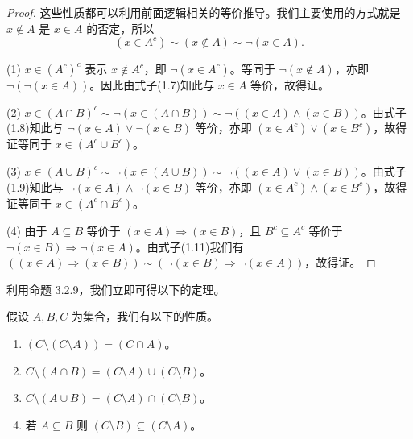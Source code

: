\begin{proof}
这些性质都可以利用前面逻辑相关的等价推导。我们主要使用的方式就是 $x \notin A$ 是 $x \in A$ 的否定，所以
$$ (x \in A^c) \sim (x \notin A)\sim \neg(x \in A). $$

(1) $x \in (A^c)^c$ 表示 $x \notin A^c$，即 $\neg(x \in A^c)$。等同于 $\neg(x \notin A)$，亦即 $\neg(\neg(x \in A))$。因此由式子(1.7)知此与 $x \in A$ 等价，故得证。

(2) $x \in (A \cap B)^c \sim \neg(x \in (A \cap B)) \sim \neg((x \in A) \wedge (x \in B))$。由式子(1.8)知此与 $\neg(x \in A) \vee \neg(x \in B)$ 等价，亦即 $(x \in A^c) \vee (x \in B^c)$，故得证等同于 $x \in (A^c \cup B^c)$。

(3) $x \in (A \cup B)^c \sim \neg(x \in (A \cup B)) \sim \neg((x \in A) \vee (x \in B))$。由式子(1.9)知此与 $\neg(x \in A) \wedge \neg(x \in B)$ 等价，亦即 $(x \in A^c) \wedge (x \in B^c)$，故得证等同于 $x \in (A^c \cap B^c)$。

(4) 由于 $A \subseteq B$ 等价于 $(x \in A) \Rightarrow (x \in B)$，且 $B^c \subseteq A^c$ 等价于 $\neg(x \in B) \Rightarrow \neg(x \in A)$。由式子(1.11)我们有$((x \in A) \Rightarrow (x \in B)) \sim (\neg(x \in B) \Rightarrow \neg(x \in A))$，故得证。
\end{proof}

利用命题 3.2.9，我们立即可得以下的定理。

\begin{corollary}
假设 $A, B, C$ 为集合，我们有以下的性质。
\begin{enumerate}[label={(\arabic*)}]
  \item $(C \setminus (C \setminus A)) = (C \cap A)$。
  \item $C \setminus (A \cap B) = (C \setminus A) \cup (C \setminus B)$。
  \item $C \setminus (A \cup B) = (C \setminus A) \cap (C \setminus B)$。
  \item 若 $A \subseteq B$ 则 $(C \setminus B) \subseteq (C \setminus A)$。
\end{enumerate}
\end{corollary}

